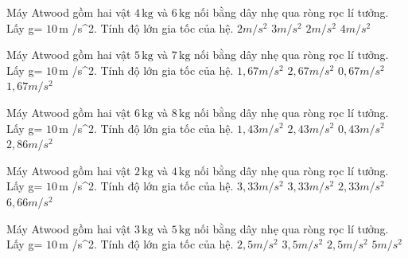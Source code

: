 \begin{ex}
Máy Atwood gồm hai vật $4\,\text{kg}$ và $6\,\text{kg}$ nối bằng dây nhẹ qua ròng rọc lí tưởng. Lấy g= $10\,\text{m}$ /s^2. Tính độ lớn gia tốc của hệ.
\choice
{$2 m/s^2$}
{$3 m/s^2$}
{\True $2 m/s^2$}
{$4 m/s^2$}
\end{ex}

\begin{ex}
Máy Atwood gồm hai vật $5\,\text{kg}$ và $7\,\text{kg}$ nối bằng dây nhẹ qua ròng rọc lí tưởng. Lấy g= $10\,\text{m}$ /s^2. Tính độ lớn gia tốc của hệ.
\choice
{$1,67 m/s^2$}
{$2,67 m/s^2$}
{$0,67 m/s^2$}
{\True $1,67 m/s^2$}
\end{ex}

\begin{ex}
Máy Atwood gồm hai vật $6\,\text{kg}$ và $8\,\text{kg}$ nối bằng dây nhẹ qua ròng rọc lí tưởng. Lấy g= $10\,\text{m}$ /s^2. Tính độ lớn gia tốc của hệ.
\choice
{\True $1,43 m/s^2$}
{$2,43 m/s^2$}
{$0,43 m/s^2$}
{$2,86 m/s^2$}
\end{ex}

\begin{ex}
Máy Atwood gồm hai vật $2\,\text{kg}$ và $4\,\text{kg}$ nối bằng dây nhẹ qua ròng rọc lí tưởng. Lấy g= $10\,\text{m}$ /s^2. Tính độ lớn gia tốc của hệ.
\choice
{$3,33 m/s^2$}
{\True $3,33 m/s^2$}
{$2,33 m/s^2$}
{$6,66 m/s^2$}
\end{ex}

\begin{ex}
Máy Atwood gồm hai vật $3\,\text{kg}$ và $5\,\text{kg}$ nối bằng dây nhẹ qua ròng rọc lí tưởng. Lấy g= $10\,\text{m}$ /s^2. Tính độ lớn gia tốc của hệ.
\choice
{$2,5 m/s^2$}
{$3,5 m/s^2$}
{\True $2,5 m/s^2$}
{$5 m/s^2$}
\end{ex}

